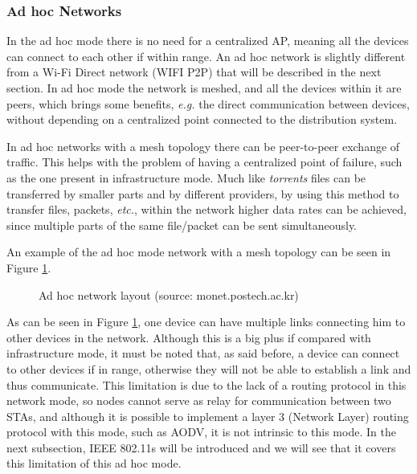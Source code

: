 \subsubsection{Ad hoc Networks}

In the ad hoc mode there is no need for a centralized \gls{AP}, meaning all the devices can connect to each other if within range. An ad hoc network is slightly different from a Wi-Fi Direct network (WIFI P2P) that will be described in the next section. In ad hoc mode the network is meshed, and all the devices within it are peers, which brings some benefits, \textit{e.g.} the direct communication between devices, without depending on a centralized point connected to the distribution system.

In ad hoc networks with a mesh topology there can be peer-to-peer exchange of traffic. This helps with the problem of having a centralized point of failure, such as the one present in infrastructure mode. Much like \textit{torrents} files can be transferred by smaller parts and by different providers, by using this method to transfer files, packets, \textit{etc.}, within the network higher data rates can be achieved, since multiple parts of the same file/packet can be sent simultaneously.

An example of the ad hoc mode network with a mesh topology can be seen in Figure \ref{fig:adhocnet}.

\begin{figure}[ht]
	\noindent{}
	\caption{\label{fig:adhocnet} Ad hoc network layout (source: monet.postech.ac.kr)}
\end{figure}

As can be seen in Figure \ref{fig:adhocnet}, one device can have multiple links connecting him to other devices in the network. Although this is a big plus if compared with infrastructure mode, it must be noted that, as said before, a device can connect to other devices if in range, otherwise they will not be able to establish a link and thus communicate. This limitation is due to the lack of a routing protocol in this network mode, so nodes cannot serve as relay for communication between two \glspl{STA}, and although it is possible to implement a layer 3 (Network Layer) routing protocol with this mode, such as \gls{AODV}, it is not intrinsic to this mode. In the next subsection, IEEE 802.11s will be introduced and we will see that it covers this limitation of this ad hoc mode.

